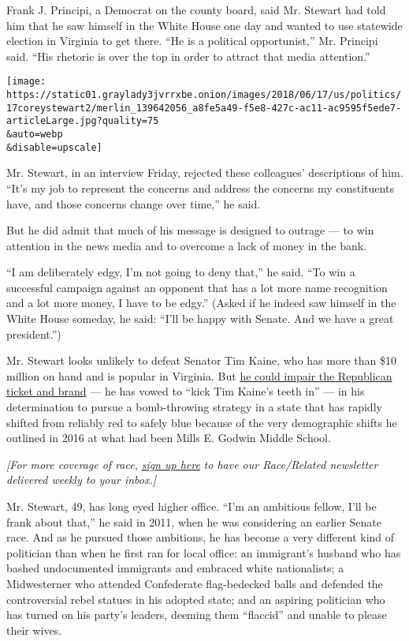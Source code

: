 Frank J. Principi, a Democrat on the county board, said Mr. Stewart had
told him that he saw himself in the White House one day and wanted to
use statewide election in Virginia to get there. ``He is a political
opportunist,'' Mr. Principi said. ``His rhetoric is over the top in
order to attract that media attention.''

\texttt{[image: https://static01.graylady3jvrrxbe.onion/images/2018/06/17/us/politics/17coreystewart2/merlin\_139642056\_a8fe5a49-f5e8-427c-ac11-ac9595f5ede7-articleLarge.jpg?quality=75\\\&auto=webp\\\&disable=upscale]}

Mr. Stewart, in an interview Friday, rejected these colleagues'
descriptions of him. ``It's my job to represent the concerns and address
the concerns my constituents have, and those concerns change over
time,'' he said.

But he did admit that much of his message is designed to outrage --- to
win attention in the news media and to overcome a lack of money in the
bank.

``I am deliberately edgy, I'm not going to deny that,'' he said. ``To
win a successful campaign against an opponent that has a lot more name
recognition and a lot more money, I have to be edgy.'' (Asked if he
indeed saw himself in the White House someday, he said: ``I'll be happy
with Senate. And we have a great president.'')

Mr. Stewart looks unlikely to defeat Senator Tim Kaine, who has more
than \$10 million on hand and is popular in Virginia. But
\href{https://www.nytimes3xbfgragh.onion/2018/06/13/us/corey-stewart-virginia-republicans.html}{he
could impair the Republican ticket and brand} --- he has vowed to ``kick
Tim Kaine's teeth in'' --- in his determination to pursue a
bomb-throwing strategy in a state that has rapidly shifted from reliably
red to safely blue because of the very demographic shifts he outlined in
2016 at what had been Mills E. Godwin Middle School.

\emph{{[}For more coverage of race,}
\emph{\href{http://www.nytimes3xbfgragh.onion/newsgraphics/2016/race-related/}{sign
up here}} \emph{to have our Race/Related newsletter delivered weekly to
your inbox.{]}}

Mr. Stewart, 49, has long eyed higher office. ``I'm an ambitious fellow,
I'll be frank about that,'' he said in 2011, when he was considering an
earlier Senate race. And as he pursued those ambitions, he has become a
very different kind of politician than when he first ran for local
office: an immigrant's husband who has bashed undocumented immigrants
and embraced white nationalists; a Midwesterner who attended Confederate
flag-bedecked balls and defended the controversial rebel statues in his
adopted state; and an aspiring politician who has turned on his party's
leaders, deeming them ``flaccid'' and unable to please their wives.

